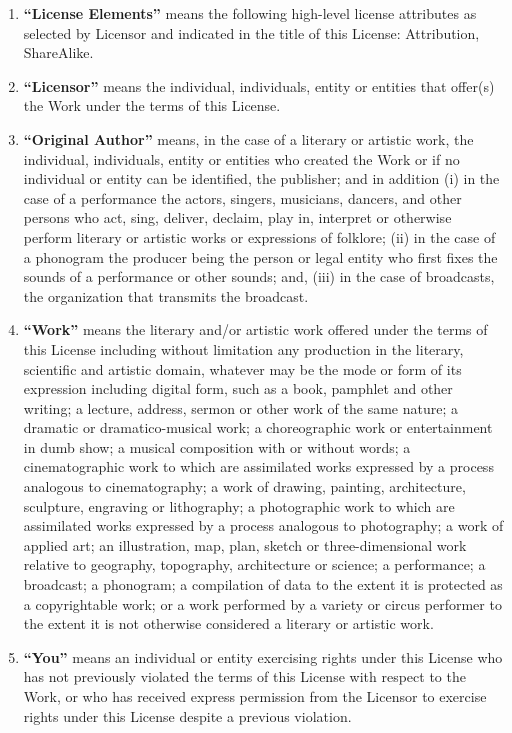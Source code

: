 \begin{enumerate}
\item \textbf{``License Elements''} means the
  following high-level license attributes as selected by
  Licensor and indicated in the title of this License:
  Attribution, ShareAlike.

\item \textbf{``Licensor''} means the individual,
  individuals, entity or entities that offer(s) the Work
  under the terms of this License.

\item \textbf{``Original Author''} means, in the case
  of a literary or artistic work, the individual,
  individuals, entity or entities who created the Work or
  if no individual or entity can be identified, the
  publisher; and in addition (i) in the case of a
  performance the actors, singers, musicians, dancers, and
  other persons who act, sing, deliver, declaim, play in,
  interpret or otherwise perform literary or artistic works
  or expressions of folklore; (ii) in the case of a
  phonogram the producer being the person or legal entity
  who first fixes the sounds of a performance or other
  sounds; and, (iii) in the case of broadcasts, the
  organization that transmits the broadcast.

\item \textbf{``Work''} means the literary and/or
  artistic work offered under the terms of this License
  including without limitation any production in the
  literary, scientific and artistic domain, whatever may be
  the mode or form of its expression including digital
  form, such as a book, pamphlet and other writing; a
  lecture, address, sermon or other work of the same
  nature; a dramatic or dramatico-musical work; a
  choreographic work or entertainment in dumb show; a
  musical composition with or without words; a
  cinematographic work to which are assimilated works
  expressed by a process analogous to cinematography; a
  work of drawing, painting, architecture, sculpture,
  engraving or lithography; a photographic work to which
  are assimilated works expressed by a process analogous to
  photography; a work of applied art; an illustration, map,
  plan, sketch or three-dimensional work relative to
  geography, topography, architecture or science; a
  performance; a broadcast; a phonogram; a compilation of
  data to the extent it is protected as a copyrightable
  work; or a work performed by a variety or circus
  performer to the extent it is not otherwise considered a
  literary or artistic work.

\item \textbf{``You''} means an individual or entity
  exercising rights under this License who has not
  previously violated the terms of this License with
  respect to the Work, or who has received express
  permission from the Licensor to exercise rights under
  this License despite a previous violation.


\end{enumerate}
